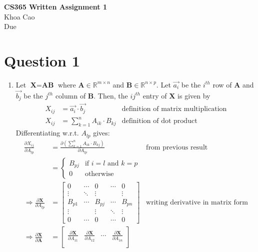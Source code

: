\documentclass[11pt, fleqn]{article}
\newcommand{\pd}[2]{\frac{\partial #1}{\partial #2}}
\begin{document}
\begin{center}
    \textbf{CS365 Written Assignment 1} \\
    Khoa Cao \\
    Due 
\end{center}

\section*{Question 1}
\begin{enumerate}
    \item Let $\textbf{X} = \textbf{AB}$ where $\textbf{A} \in \mathbb{R}^{m \times n}$ and $\textbf{B} \in \mathbb{R}^{n \times p}$. Let $\vec{a_i}$ be the $i^{th}$ row of $\textbf{A}$ and $\vec{b_j}$ be the $j^{th}$ column of $\textbf{B}$. Then, the $ij^{th}$ entry of $\textbf{X}$ is given by
    \begin{align*}
        X_{ij} &= \vec{a_i} \cdot \vec{b_j} & \text{definition of matrix multiplication} \\
        X_{ij} &= \sum_{k=1}^{n} A_{ik} \cdot B_{kj} & \text{definition of dot product}
    \end{align*}
    Differentiating w.r.t. $A_{lp}$ gives:
    \begin{align*}
        \pd{X_{ij}}{A_{lp}} &= \pd{(\sum_{k=1}^{n} A_{ik} \cdot B_{kj})}{A_{lp}} & \text{from previous result} \\
        &= \begin{cases}
            B_{pj} & \text{if } i = l \text{ and } k = p \\
            0 & \text{otherwise}
        \end{cases} \\
        \Rightarrow \pd{\textbf{X}}{A_{lp}} &= \begin{bmatrix}
            0 & \cdots & 0 & \cdots & 0 \\
            \vdots & \ddots & \vdots & & \vdots \\
            B_{p1} & \cdots & B_{pj} & \cdots & B_{pn} \\
            \vdots & & \vdots & \ddots & \vdots \\
            0 & \cdots & 0 & \cdots & 0
        \end{bmatrix} & \text{writing derivative in matrix form} \\
        \Rightarrow \pd{\textbf{X}}{\textbf{A}} &= \begin{bmatrix}
            \pd{\textbf{X}}{A_{11}} & \pd{\textbf{X}}{A_{12}} & \cdots & \pd{\textbf{X}}{A_{1n}} \\

\end{bmatrix}
\end{align*}
\end{enumerate}
\end{document}
